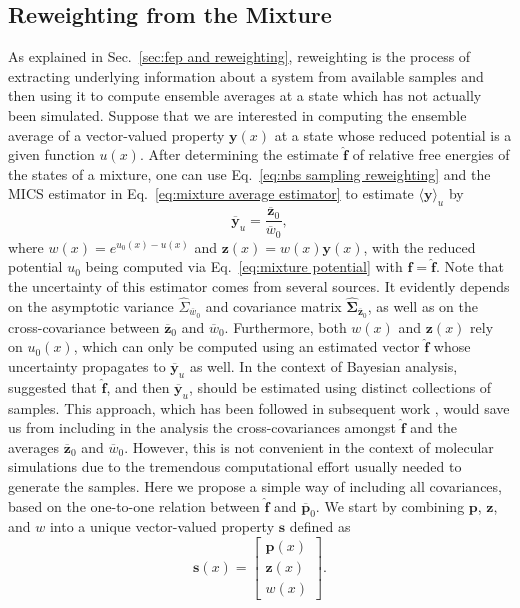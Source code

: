 \documentclass[journal=jctcce,manuscript=article,layout=twocolumn]{achemso}
\newcommand{\mt}[1]{\boldsymbol{\mathbf{#1}}}   %
\newcommand{\vt}[1]{\boldsymbol{\mathbf{#1}}}   %
\newcommand{\avg}[1]{\overline{#1}}             %
\begin{document}
\subsection{Reweighting from the Mixture}

As explained in Sec.~\ref{sec:fep and reweighting}, reweighting is the process of extracting underlying information about a system from available samples and then using it to compute ensemble averages at a state which has not actually been simulated. Suppose that we are interested in computing the ensemble average of a vector-valued property $\vt y(x)$ at a state whose reduced potential is a given function $u(x)$. After determining the estimate $\hat{\vt f}$ of relative free energies of the states of a mixture, one can use Eq.~\eqref{eq:nbs sampling reweighting} and the MICS estimator in Eq.~\eqref{eq:mixture average estimator} to estimate $\langle \vt y \rangle_u$ by
\begin{equation}
\label{eq:reweighting from mixture}
\avg{\vt y}_u = \frac{\avg{\vt z}_0}{\avg{w}_0},
\end{equation}
where $w(x) = e^{u_0(x) - u(x)}$ and ${\vt z}(x) = w(x) {\vt y}(x)$, with the reduced potential $u_0$ being computed via Eq.~\eqref{eq:mixture potential} with $\vt f = \hat{\vt f}$. Note that the uncertainty of this estimator comes from several sources. It evidently depends on the asymptotic variance $\hat \Sigma_{\avg w_0}$ and covariance matrix $\hat{\mt \Sigma}_{\avg{\vt z}_0}$, as well as on the cross-covariance between $\avg{\vt z}_0$ and $\avg w_0$. Furthermore, both $w(x)$ and $\vt z(x)$ rely on $u_0(x)$, which can only be computed using an estimated vector $\hat{\vt f}$ whose uncertainty propagates to $\avg{\vt y}_u$ as well. In the context of Bayesian analysis, \citeauthor{Buta_2011} \cite{Buta_2011} suggested that $\hat{\vt f}$, and then $\avg{\vt y}_u$, should be estimated using distinct collections of samples. This approach, which has been followed in subsequent work \cite{Tan_2015, Roy_2018}, would save us from including in the analysis the cross-covariances amongst $\hat{\vt f}$ and the averages $\avg{\vt z}_0$ and $\avg w_0$. However, this is not convenient in the context of molecular simulations due to the tremendous computational effort usually needed to generate the samples. Here we propose a simple way of including all covariances, based on the one-to-one relation between $\hat{\vt f}$ and $\avg{\vt p}_0$. We start by combining $\vt p$, $\vt z$, and $w$ into a unique vector-valued property $\vt s$ defined as
\begin{equation*}
\vt s(x) = \left[\begin{array}{c}
\vt p(x) \\
\vt z(x) \\
w(x)
\end{array}\right].
\end{equation*}
\end{document}
